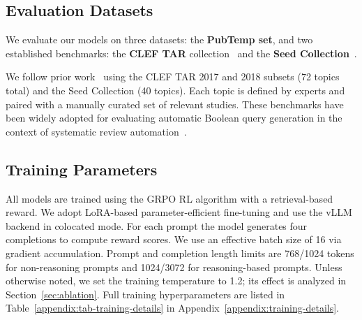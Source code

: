 \subsection{Evaluation Datasets}
We evaluate our models on three datasets: the \textbf{PubTemp set}, and two established benchmarks: the \textbf{CLEF TAR} collection~\cite{kanoulas2018clef} and the \textbf{Seed Collection}~\cite{wang2022little}.

We follow prior work~\cite{wang2025reassessing} using the CLEF TAR 2017 and 2018 subsets (72 topics total) and the Seed Collection (40 topics). Each topic is defined by experts and paired with a manually curated set of relevant studies. These benchmarks have been widely adopted for evaluating automatic Boolean query generation in the context of systematic review automation~\cite{macfarlane2022search, kusa2023csmed, wang2022neural, stevenson2023stopping, lee2018seed}.

\subsection{Training Parameters}

All models are trained using the GRPO RL algorithm with a retrieval-based reward. We adopt LoRA-based parameter-efficient fine-tuning and use the vLLM backend in colocated mode.
For each prompt the model generates four completions to compute reward scores. We use an effective batch size of 16 via gradient accumulation. Prompt and completion length limits are 768/1024 tokens for non-reasoning prompts and 1024/3072 for reasoning-based prompts.
Unless otherwise noted, we set the training temperature to 1.2; its effect is analyzed in Section~\ref{sec:ablation}. Full training hyperparameters are listed in Table~\ref{appendix:tab-training-details} in Appendix~\ref{appendix:training-details}.